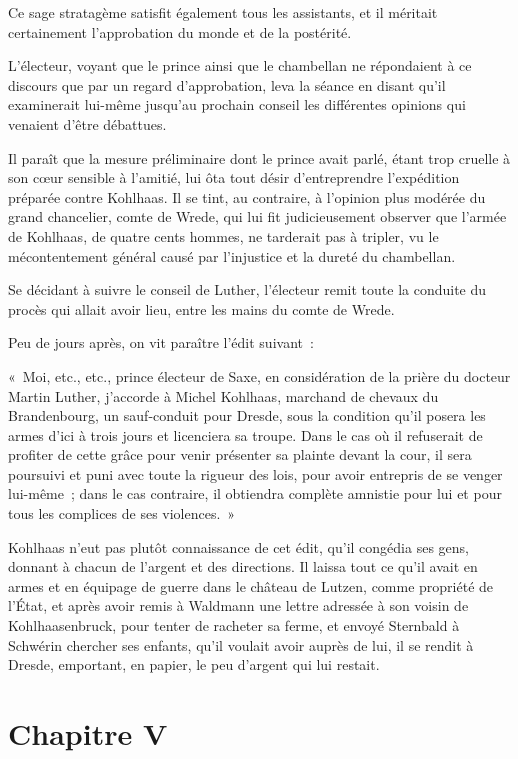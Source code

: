 \documentclass[french,twoside]{book} %
\newcommand\chapteropen{} %
\newcommand\chapterclose{} %
\begin{document}
Ce sage stratagème satisfit également tous les assistants, et il méritait certainement l’approbation du monde et de la postérité.\par
L’électeur, voyant que le prince ainsi que le chambellan ne répondaient à ce discours que par un regard d’approbation, leva la séance en disant qu’il examinerait lui-même jusqu’au prochain conseil les différentes opinions qui venaient d’être débattues.\par
Il paraît que la mesure préliminaire dont le prince avait parlé, étant trop cruelle à son cœur sensible à l’amitié, lui ôta tout désir d’entreprendre l’expédition préparée contre Kohlhaas. Il se tint, au contraire, à l’opinion plus modérée du grand chancelier, comte de Wrede, qui lui fit judicieusement observer que l’armée de Kohlhaas, de quatre cents hommes, ne tarderait pas à tripler, vu le mécontentement général causé par l’injustice et la dureté du chambellan.\par
Se décidant à suivre le conseil de Luther, l’électeur remit toute la conduite du procès qui allait avoir lieu, entre les mains du comte de Wrede.\par
Peu de jours après, on vit paraître l’édit suivant :\par
« Moi, etc., etc., prince électeur de Saxe, en considération de la prière du docteur Martin Luther, j’accorde à Michel Kohlhaas, marchand de chevaux du Brandenbourg, un sauf-conduit pour Dresde, sous la condition qu’il posera les armes d’ici à trois jours et licenciera sa troupe. Dans le cas où il refuserait de profiter de cette grâce pour venir présenter sa plainte devant la cour, il sera poursuivi et puni avec toute la rigueur des lois, pour avoir entrepris de se venger lui-même ; dans le cas contraire, il obtiendra complète amnistie pour lui et pour tous les complices de ses violences. »\par
Kohlhaas n’eut pas plutôt connaissance de cet édit, qu’il congédia ses gens, donnant à chacun de l’argent et des directions. Il laissa tout ce qu’il avait en armes et en équipage de guerre dans le château de Lutzen, comme propriété de l’État, et après avoir remis à Waldmann une lettre adressée à son voisin de Kohlhaasenbruck, pour tenter de racheter sa ferme, et envoyé Sternbald à Schwérin chercher ses enfants, qu’il voulait avoir auprès de lui, il se rendit à Dresde, emportant, en papier, le peu d’argent qui lui restait.
\chapterclose


\chapteropen
\chapter[{Chapitre V}]{Chapitre V}\renewcommand{\leftmark}{Chapitre V}
\end{document}
